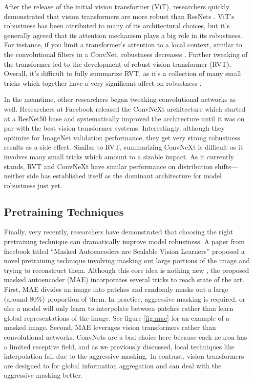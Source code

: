\documentclass{article}
\begin{document}
After the release of the initial vision transformer (ViT), researchers quickly demonstrated that vision transformers are more robust than ResNets \cite{bhojanapalli2021understanding, morrison2021exploring, paul2021vision}. ViT's robustness has been attributed to many of its architectural choices, but it's generally agreed that its attention mechanism plays a big role in its robustness. For instance, if you limit a transformer's attention to a local context, similar to the convolutional filters in a ConvNet, robustness decreases \cite{mao2021robust}. Further tweaking of the transformer led to the development of robust vision transformer (RVT). Overall, it's difficult to fully summarize RVT, as it's a collection of many small tricks which together have a very significant affect on robustness \cite{mao2021robust}. 

In the meantime, other researchers began tweaking convolutional networks as well. Researchers at Facebook released the ConvNeXt architecture \cite{liu2022convnet} which started at a ResNet50 base and systematically improved the architecture until it was on par with the best vision transformer systems. Interestingly, although they optimize for ImageNet validation performance, they get very strong robustness results as a side effect. Similar to RVT, summarizing ConvNeXt is difficult as it involves many small tricks which amount to a sizable impact. As it currently stands, RVT and ConvNeXt have similar performance on distribution shifts—neither side has established itself as the dominant architecture for model robustness just yet.

\subsection{Pretraining Techniques}
Finally, very recently, researchers have demonstrated that choosing the right pretraining technique can dramatically improve model robustness. A paper from facebook titled ``Masked Autoencoders are Scalable Vision Learners'' proposed a novel pretraining technique involving masking out large portions of the image and trying to reconstruct them. Although this core idea is nothing new \cite{vincent2008extracting, devlin2019bert}, the proposed masked autoencoder (MAE) incorporates several tricks to reach state of the art. First, MAE divides an image into patches and randomly masks out a large (around 80\%) proportion of them. In practice, aggressive masking is required, or else a model will only learn to interpolate between patches rather than learn global representations of the image. See figure \ref{fig:mae} for an example of a masked image. Second, MAE leverages vision transformers rather than convolutional networks. ConvNets are a bad choice here because each neuron has a limited receptive field, and as we previously discussed, local techniques like interpolation fail due to the aggressive masking. In contrast, vision transformers are designed to for global information aggregation and can deal with the aggressive masking better. 
\end{document}
